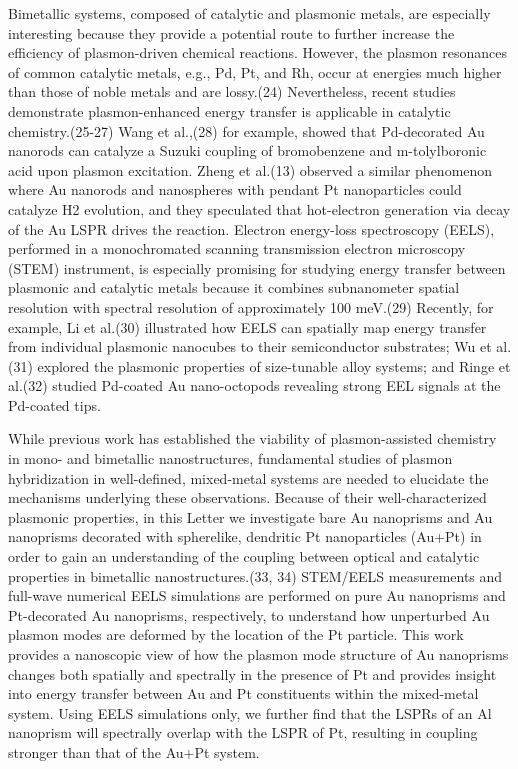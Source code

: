 \documentclass [11pt, proquest] {uwthesis}[2016/11/22]
\begin{document}
Bimetallic systems, composed of catalytic and plasmonic metals, are especially interesting because they provide a potential route to further increase the efficiency of plasmon-driven chemical reactions. However, the plasmon resonances of common catalytic metals, e.g., Pd, Pt, and Rh, occur at energies much higher than those of noble metals and are lossy.(24) Nevertheless, recent studies demonstrate plasmon-enhanced energy transfer is applicable in catalytic chemistry.(25-27) Wang et al.,(28) for example, showed that Pd-decorated Au nanorods can catalyze a Suzuki coupling of bromobenzene and m-tolylboronic acid upon plasmon excitation. Zheng et al.(13) observed a similar phenomenon where Au nanorods and nanospheres with pendant Pt nanoparticles could catalyze H2 evolution, and they speculated that hot-electron generation via decay of the Au LSPR drives the reaction.
Electron energy-loss spectroscopy (EELS), performed in a monochromated scanning transmission electron microscopy (STEM) instrument, is especially promising for studying energy transfer between plasmonic and catalytic metals because it combines subnanometer spatial resolution with spectral resolution of approximately 100 meV.(29) Recently, for example, Li et al.(30) illustrated how EELS can spatially map energy transfer from individual plasmonic nanocubes to their semiconductor substrates; Wu et al.(31) explored the plasmonic properties of size-tunable alloy systems; and Ringe et al.(32) studied Pd-coated Au nano-octopods revealing strong EEL signals at the Pd-coated tips.

While previous work has established the viability of plasmon-assisted chemistry in mono- and bimetallic nanostructures, fundamental studies of plasmon hybridization in well-defined, mixed-metal systems are needed to elucidate the mechanisms underlying these observations. Because of their well-characterized plasmonic properties, in this Letter we investigate bare Au nanoprisms and Au nanoprisms decorated with spherelike, dendritic Pt nanoparticles (Au+Pt) in order to gain an understanding of the coupling between optical and catalytic properties in bimetallic nanostructures.(33, 34) STEM/EELS measurements and full-wave numerical EELS simulations are performed on pure Au nanoprisms and Pt-decorated Au nanoprisms, respectively, to understand how unperturbed Au plasmon modes are deformed by the location of the Pt particle. This work provides a nanoscopic view of how the plasmon mode structure of Au nanoprisms changes both spatially and spectrally in the presence of Pt and provides insight into energy transfer between Au and Pt constituents within the mixed-metal system. Using EELS simulations only, we further find that the LSPRs of an Al nanoprism will spectrally overlap with the LSPR of Pt, resulting in coupling stronger than that of the Au+Pt system.
\end{document}
